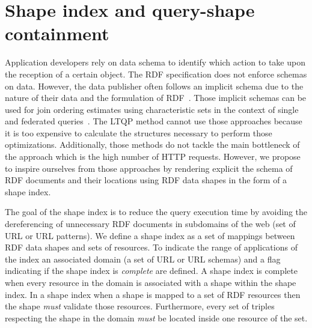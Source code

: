 \section{Shape index and query-shape containment}



Application developers rely on data schema to identify which action to take upon the reception of a certain object.
The RDF specification does not enforce schemas on data.
However, the data publisher often follows an implicit schema due to the nature of their data and the formulation of RDF~\cite{Neumann2011CharacteristicSA}.
Those implicit schemas can be used  for join ordering estimates using characteristic sets in the context of single and federated queries~\cite{Neumann2011CharacteristicSA, Meimaris2017ExtendedCS, Meimaris2018HierarchicalCS}.
The LTQP method cannot use those approaches because it is too expensive to calculate the structures necessary to perform those optimizations.
Additionally, those methods do not tackle the main bottleneck of the approach which is the high number of HTTP requests.
However, we propose to inspire ourselves from those approaches by rendering explicit the schema of RDF documents and their locations using RDF data shapes in the form of a shape index.

The goal of the shape index is to reduce the query execution time by avoiding the dereferencing of unnecessary RDF documents in subdomains of the web (set of URL or URL patterns).
We define a shape index as a set of mappings between RDF data shapes and sets of resources.
To indicate the range of applications of the index an associated domain (a set of URL or URL schemas) and a flag indicating if the shape index is \emph{complete} are defined.
A shape index is complete when every resource in the domain is associated with a shape within the shape index.
In a shape index when a shape is mapped to a set of RDF resources then the shape \emph{must} validate those resources.
Furthermore, every set of triples respecting the shape in the domain \emph{must} be located inside one resource of the set.

